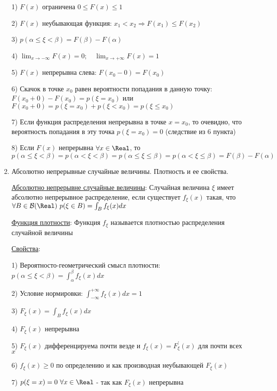 \begin{enumerate}
    1) $F(x)$ ограничена $0 \leq F(x) \leq 1$

    2) $F(x)$ неубывающая функция: $x_1 < x_2 \Longrightarrow F(x_1) \leq F(x_2)$ 

    3) $p(\alpha \leq \xi < \beta) = F(\beta) - F(\alpha)$

    4) $\lim_{x \to -\infty} F(x) = 0; \quad \lim_{x \to +\infty} F(x) = 1$
    
    5) $F(x)$ непрерывна слева: $F(x_0 - 0) = F(x_0)$

    6) Скачок в точке $x_0$ равен вероятности попадания в данную точку: $F(x_0 + 0) - F(x_0) = p(\xi = x_0)$ или $F(x_0 + 0) = p(\xi = x_0) + p(\xi < x_0) = p(\xi \leq x_0)$

    7) Если функция распределения непрерывна в точке $x = x_0$, то очевидно, что вероятность попадания в эту точка $p(\xi = x_0) = 0$ (следствие из 6 пункта)
    
    8) Если $F(x)$ непрерывна $\forall x \in \Real$, то $p(\alpha \leq \xi < \beta) = p(\alpha < \xi < \beta) = p(\alpha \leq \xi \leq \beta) = p(\alpha < \xi \leq \beta) = F(\beta) - F(\alpha)$
    
    \item Абсолютно непрерывные случайные величины. Плотность и ее свойства.

    \hyperlink{continuousdistributionproperties}{Абсолютно непрерывне случайные величины}: Случайная величина $\xi$ имеет абсолютно непрерывное распределение, если существует $f_\xi(x)$ такая, что $\forall B \in \mathcal{B}(\Real)
    \ p(\xi \in B) = \int_B f_\xi(x)dx$

    \hyperlink{densityfunctiondefinition}{Функция плотности}: Функция $f_\xi$ называется плотностью распределения случайной величины

    \hyperlink{densityfunctionproperties}{Свойства}:

    1) Вероятносто-геометрический смысл плотности: $p(\alpha \leq \xi < \beta) = \int_{\alpha}^\beta f_\xi(x) dx$

    2) Условие нормировки: $\int_{-\infty}^{+\infty} f_\xi(x)dx = 1$

    3) $F_\xi(x) = \int_B f_\xi(x)dx$

    4) $F_\xi(x)$ непрерывна 

    5) $F_\xi(x)$ дифференцируема почти везде и $f_\xi(x) = F^\prime_\xi(x)$ для почти всех $x$

    6) $f_\xi(x) \geq 0$ по определению и как производная неубывающей $F_\xi(x)$

    7) $p(\xi = x) = 0 \ \forall x \in \Real$ - так как $F_\xi(x)$ непрерывна


\end{enumerate}
